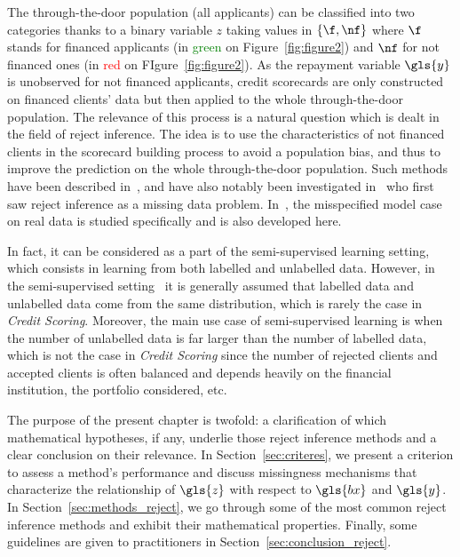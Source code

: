 The through-the-door population (all applicants) can be classified into two categories thanks to a binary variable $z$ taking values in $\{\f,\nf\}$ where $\f$ stands for financed applicants (in \textcolor{green}{green} on Figure~\ref{fig:figure2}) and $\nf$ for not financed ones (in \textcolor{red}{red} on FIgure~\ref{fig:figure2}). As the repayment variable $\gls{y}$ is unobserved for not financed applicants, credit scorecards are only constructed on financed clients' data but then applied to the whole  through-the-door population. The relevance of this process is a natural question which is dealt in the field of {reject inference}. The idea is to use the characteristics of not financed clients in the scorecard building process to avoid a population bias, and thus to improve the prediction on the whole through-the-door population. Such methods have been described in~\cite{RI6,saporta,banasik,economix}, and have also notably been investigated in~\cite{RI2} who first saw {reject inference} as a missing data problem. In~\cite{RI3}, the misspecified model case on real data is studied specifically and is also developed here.


In fact, it can be considered as a part of the semi-supervised learning setting, which consists in learning from both labelled and unlabelled data. However, in the semi-supervised setting~\cite{ChaSchZie06} it is generally assumed that labelled data and unlabelled data come from the same distribution, which is rarely the case in \textit{Credit Scoring}. Moreover, the main use case of semi-supervised learning is when the number of unlabelled data is far larger than the number of labelled data, which is not the case in \textit{Credit Scoring} since the number of rejected clients and accepted clients is often balanced and depends heavily on the financial institution, the portfolio considered, etc.


The purpose of the present chapter is twofold: a clarification of which mathematical hypotheses, if any, underlie those reject inference methods and a clear conclusion on their relevance. In Section~\ref{sec:criteres}, we present a criterion to assess a method's performance and discuss missingness mechanisms that characterize the relationship of $\gls{z}$ with respect to $\gls{bx}$ and $\gls{y}$. In Section~\ref{sec:methods_reject}, we go through some of the most common reject inference methods and exhibit their mathematical properties. 
Finally, some guidelines are given to practitioners in Section~\ref{sec:conclusion_reject}.


